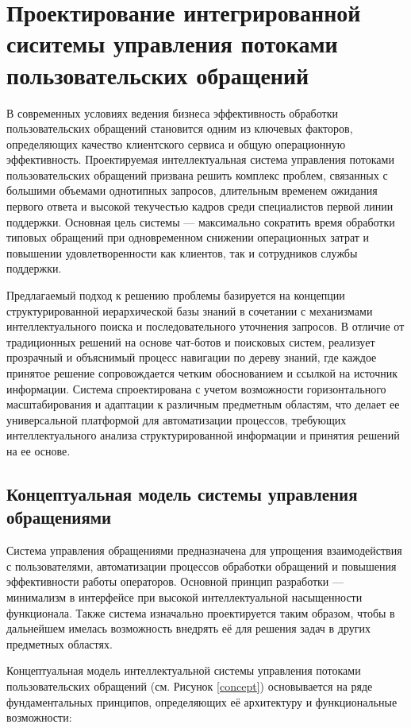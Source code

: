 \section{Проектирование интегрированной сиситемы управления потоками пользовательских обращений}
\label{sec:designing}

В современных условиях ведения бизнеса эффективность обработки пользовательских обращений становится одним из ключевых факторов, определяющих качество клиентского сервиса и общую операционную эффективность. Проектируемая интеллектуальная система управления потоками пользовательских обращений призвана решить комплекс проблем, связанных с большими объемами однотипных запросов, длительным временем ожидания первого ответа и высокой текучестью кадров среди специалистов первой линии поддержки. Основная цель системы — максимально сократить время обработки типовых обращений при одновременном снижении операционных затрат и повышении удовлетворенности как клиентов, так и сотрудников службы поддержки.

Предлагаемый подход к решению проблемы базируется на концепции структурированной иерархической базы знаний в сочетании с механизмами интеллектуального поиска и последовательного уточнения запросов. В отличие от традиционных решений на основе чат-ботов и поисковых систем, реализует прозрачный и объяснимый процесс навигации по дереву знаний, где каждое принятое решение сопровождается четким обоснованием и ссылкой на источник информации. Система спроектирована с учетом возможности горизонтального масштабирования и адаптации к различным предметным областям, что делает ее универсальной платформой для автоматизации процессов, требующих интеллектуального анализа структурированной информации и принятия решений на ее основе.

\subsection{Концептуальная модель системы управления обращениями}

Система управления обращениями предназначена для упрощения взаимодействия с пользователями, автоматизации процессов обработки обращений и повышения эффективности работы операторов. Основной принцип разработки — минимализм в интерфейсе при высокой интеллектуальной насыщенности функционала. Также система изначально проектируется таким образом, чтобы в дальнейшем имелась возможность внедрять её для решения задач в других предметных областях.

Концептуальная модель интеллектуальной системы управления потоками пользовательских обращений (см. Рисунок \ref{concept}) основывается на ряде фундаментальных принципов, определяющих её архитектуру и функциональные возможности:

